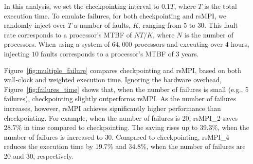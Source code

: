 

In this analysis, we set the checkpointing interval to $0.1T$, where $T$ is the total execution time. To emulate failures, for both checkpointing and rsMPI, we randomly inject over $T$ a number of faults, $K$, ranging from 5 to 30. This fault rate corresponds to a processor's MTBF of $NT/K$, where $N$ is the number of processors. %
When using a system of $64,000$ processors and executing over $4$ hours, injecting $10$ faults corresponds to a processor's MTBF of $3$ years.

Figure~\ref{fig:multiple_failure} compares checkpointing and rsMPI, based on both wall-clock and weighted execution time. Ignoring the hardware overhead, Figure~\ref{fig:failures_time} shows that, when the number of failures is small (e.g., 5 failures), checkpointing slightly outperforms rsMPI. As the number of failures increases, however, rsMPI achieves significantly higher performance than checkpointing. For example, when the number of failures is 20, rsMPI\_2 saves 28.7\% in time compared to checkpointing. The saving rises up to 39.3\%, when the number of failures is increased to $30$. Compared to checkpointing, rsMPI\_4 reduces the execution time by 19.7\% and 34.8\%, when the number of failures are 20 and 30, respectively. 

